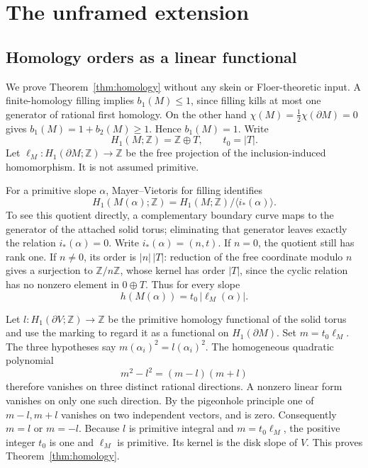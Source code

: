 \documentclass[11pt]{amsart}
\theoremstyle{definition}
\theoremstyle{remark}
\newcommand{\Z}{\mathbb Z}
\newcommand{\bd}{\partial}
\begin{document}
\section{The unframed extension}\label{sec:unframed}

\subsection{Homology orders as a linear functional}

We prove Theorem~\ref{thm:homology} without
any skein or Floer-theoretic input.
A finite-homology filling implies
\(b_1(M)\le1\), since filling kills at
most one generator of rational first
homology. On the other hand
\(\chi(M)=\frac12\chi(\bd M)=0\) gives
\(b_1(M)=1+b_2(M)\ge1\).
Hence \(b_1(M)=1\). Write
\[
 H_1(M;\Z)=\Z\oplus T,\qquad t_0=|T|.
\]
Let \(\ell_M:H_1(\bd M;\Z)\to\Z\)
be the free projection of the
inclusion-induced homomorphism.
It is not assumed primitive.

For a primitive slope \(\alpha\),
Mayer--Vietoris for filling identifies
\[
 H_1(M(\alpha);\Z)=
 H_1(M;\Z)/\langle i_*(\alpha)\rangle .
\]
To see this quotient directly, a
complementary boundary curve maps to
the generator of the attached solid
torus; eliminating that generator
leaves exactly the relation
\(i_*(\alpha)=0\).
Write \(i_*(\alpha)=(n,t)\).
If \(n=0\), the quotient still has
rank one. If \(n\ne0\), its order is
\(|n|\,|T|\): reduction of the free
coordinate modulo \(n\) gives a
surjection to \(\Z/n\Z\), whose kernel
has order \(|T|\), since the cyclic
relation has no nonzero element in
\(0\oplus T\).
Thus for every slope
\begin{equation}\label{eq:linearh}
 h(M(\alpha))=t_0\,|\ell_M(\alpha)|.
\end{equation}

Let \(l:H_1(\bd V;\Z)\to\Z\) be the
primitive homology functional of the
solid torus and use the marking to
regard it as a functional on
\(H_1(\bd M)\). Set \(m=t_0\ell_M\).
The three hypotheses say
\(m(\alpha_i)^2=l(\alpha_i)^2\).
The homogeneous quadratic polynomial
\[
 m^2-l^2=(m-l)(m+l)
\]
therefore vanishes on three distinct
rational directions. A nonzero linear
form vanishes on only one such
direction. By the pigeonhole principle
one of \(m-l,m+l\) vanishes on two
independent vectors, and is zero.
Consequently \(m=l\) or \(m=-l\).
Because \(l\) is primitive integral
and \(m=t_0\ell_M\), the positive
integer \(t_0\) is one and \(\ell_M\)
is primitive. Its kernel is the disk
slope of \(V\). This proves
Theorem~\ref{thm:homology}.
\end{document}
